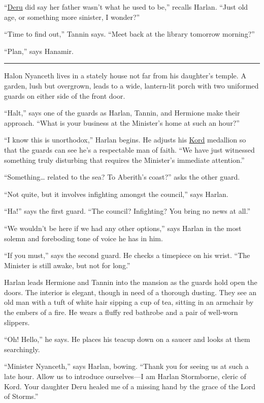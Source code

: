 \documentclass[smalldemyvopaper,11pt,twoside,onecolumn,openright,extrafontsizes]{memoir}
\begin{document}
``\href{/characters/deru/}{Deru} did say her father wasn't what he used
to be,'' recalls Harlan. ``Just old age, or something more sinister, I
wonder?''

``Time to find out,'' Tannin says. ``Meet back at the library tomorrow
morning?''

``Plan,'' says Hanamir.

\begin{center}\rule{0.5\linewidth}{\linethickness}\end{center}

Halon Nyanceth lives in a stately house not far from his daughter's
temple. A garden, lush but overgrown, leads to a wide, lantern-lit porch
with two uniformed guards on either side of the front door.

``Halt,'' says one of the guards as Harlan, Tannin, and Hermione make
their approach. ``What is your business at the Minister's home at such
an hour?''

``I know this is unorthodox,'' Harlan begins. He adjusts his
\href{/characters/kord/}{Kord} medallion so that the guards can see he's
a respectable man of faith. ``We have just witnessed something truly
disturbing that requires the Minister's immediate attention.''

``Something\ldots{} related to the sea? To Aberith's coast?'' asks the
other guard.

``Not quite, but it involves infighting amongst the council,'' says
Harlan.

``Ha!'' says the first guard. ``The council? Infighting? You bring no
news at all.''

``We wouldn't be here if we had any other options,'' says Harlan in the
most solemn and foreboding tone of voice he has in him.

``If you must,'' says the second guard. He checks a timepiece on his
wrist. ``The Minister is still awake, but not for long.''

Harlan leads Hermione and Tannin into the mansion as the guards hold
open the doors. The interior is elegant, though in need of a thorough
dusting. They see an old man with a tuft of white hair sipping a cup of
tea, sitting in an armchair by the embers of a fire. He wears a fluffy
red bathrobe and a pair of well-worn slippers.

``Oh! Hello,'' he says. He places his teacup down on a saucer and looks
at them searchingly.

``Minister Nyanceth,'' says Harlan, bowing. ``Thank you for seeing us at
such a late hour. Allow us to introduce ourselves---I am Harlan
Stormborne, cleric of Kord. Your daughter Deru healed me of a missing
hand by the grace of the Lord of Storms.''
\end{document}
